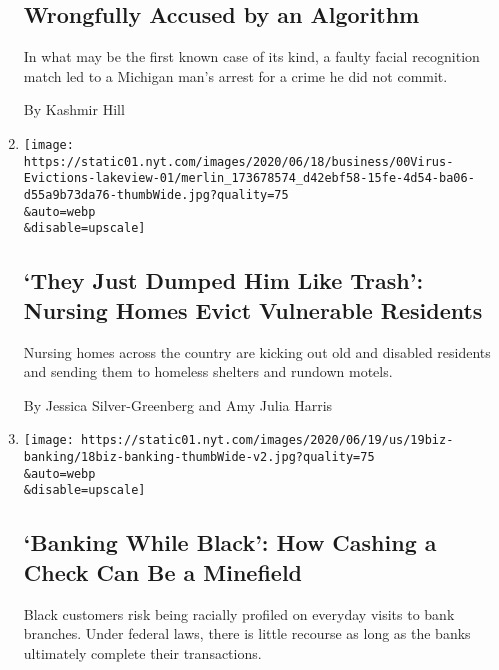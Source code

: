\begin{enumerate}
{  \subsection{Wrongfully Accused by an
  Algorithm}\label{wrongfully-accused-by-an-algorithm}}

  In what may be the first known case of its kind, a faulty facial
  recognition match led to a Michigan man's arrest for a crime he did
  not commit.

  By Kashmir Hill
\item
  \href{/2020/06/21/business/nursing-homes-evictions-discharges-coronavirus.html}{}

  \texttt{[image: https://static01.nyt.com/images/2020/06/18/business/00Virus-Evictions-lakeview-01/merlin\_173678574\_d42ebf58-15fe-4d54-ba06-d55a9b73da76-thumbWide.jpg?quality=75\\\&auto=webp\\\&disable=upscale]}

  \hypertarget{they-just-dumped-him-like-trash-nursing-homes-evict-vulnerable-residents}{%
  \subsection{`They Just Dumped Him Like Trash': Nursing Homes Evict
  Vulnerable
  Residents}\label{they-just-dumped-him-like-trash-nursing-homes-evict-vulnerable-residents}}

  Nursing homes across the country are kicking out old and disabled
  residents and sending them to homeless shelters and rundown motels.

  By Jessica Silver-Greenberg and Amy Julia Harris
\item
  \href{/2020/06/18/business/banks-black-customers-racism.html}{}

  \texttt{[image: https://static01.nyt.com/images/2020/06/19/us/19biz-banking/18biz-banking-thumbWide-v2.jpg?quality=75\\\&auto=webp\\\&disable=upscale]}

  \hypertarget{banking-while-black-how-cashing-a-check-can-be-a-minefield}{%
  \subsection{`Banking While Black': How Cashing a Check Can Be a
  Minefield}\label{banking-while-black-how-cashing-a-check-can-be-a-minefield}}

  Black customers risk being racially profiled on everyday visits to
  bank branches. Under federal laws, there is little recourse as long as
  the banks ultimately complete their transactions.


\end{enumerate}
